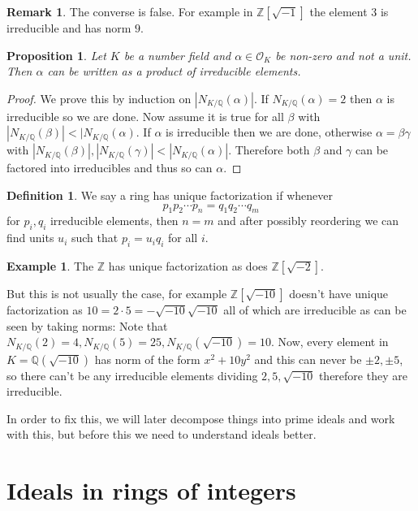 \documentclass[11pt,a4paper]{report}
\theoremstyle{plain}
\newtheorem{prop}[subsection]{Proposition}
\theoremstyle{definition}
\newtheorem{definition}[subsection]{Definition}
\newtheorem{exmp}[subsection]{Example}
\theoremstyle{definition}
\newtheorem{rmrk}[subsection]{Remark}
\newcommand{\ZZ}{\mathbb{Z}}
\def\QQ{\mathbb{Q}}
\def \Nm {N_{K/\QQ}}
\def \a{\alpha}
\def \OO {\mathcal{O}}
\begin{document}
	
	\begin{rmrk}
		The converse is false. For example in $\ZZ[\sqrt{-1}]$ the element $3$ is irreducible and has norm $9$.
	\end{rmrk}
	
	\begin{prop}
		Let $K$ be a number field and $\a \in \OO_K$ be non-zero and not a unit. Then $\a$ can be written as a product of irreducible elements.
	\end{prop}
	
	\begin{proof}
		We prove this by induction on $|\Nm(\a)|$. If $\Nm(\a)=2$ then $\a$ is irreducible so we are done. Now assume it is true for all $\beta$ with $|\Nm(\beta)|< |\Nm(\a)$. If $\a$ is irreducible then we are done, otherwise $\a=\beta \gamma$ with $|\Nm(\beta)|, |\Nm(\gamma)|< |\Nm(\a)|$. Therefore both $\beta$ and $\gamma$ can be factored into irreducibles and thus so can $\a$.
	\end{proof}
	
	\begin{definition}
		We say a ring has unique factorization if whenever \[p_1p_2\cdots p_n=q_1q_2\cdots q_m\] for $p_i,q_i$ irreducible elements, then $n=m$ and after possibly reordering we can find units $u_i$ such that $p_i=u_iq_i$ for all $i$.
	\end{definition}
	
	\begin{exmp}
		The $\ZZ$ has unique factorization as does $\ZZ[\sqrt{-2}]$. 
		
		But this is not usually the case, for example $\ZZ[\sqrt{-10}]$ doesn't have unique factorization as $10=2 \cdot 5= -\sqrt{-10}\sqrt{-10}$ all of which are irreducible as can be seen by taking norms: Note that $\Nm(2)=4,\Nm(5)=25, \Nm(\sqrt{-10})=10$. Now, every element in $K=\QQ(\sqrt{-10})$ has norm of the form $x^2+10y^2$ and this can never be $\pm 2, \pm 5$, so there can't be any irreducible elements dividing $2,5,\sqrt{-10}$ therefore they are irreducible.
	\end{exmp}
	
	In order to fix this, we will later decompose things into prime ideals and work with this, but before this we need to understand ideals better.
	
	
	\section{Ideals in rings of integers}
	
\end{document}
